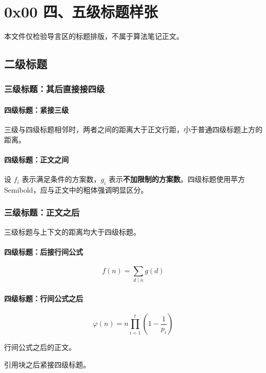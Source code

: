 \documentclass{article}
\begin{document}
\section{0x00 四、五级标题样张}
本文件仅检验导言区的标题排版，不属于算法笔记正文。

\subsection{二级标题}

\subsubsection{三级标题：其后直接接四级}

\paragraph{四级标题：紧接三级}

三级与四级标题相邻时，两者之间的距离大于正文行距，小于普通四级标题上方的距离。

\paragraph{四级标题：正文之间}

设 $f_i$ 表示满足条件的方案数，$g_i$ 表示\textbf{不加限制的方案数}。四级标题使用苹方
Semibold，应与正文中的粗体强调明显区分。

\subsubsection{三级标题：正文之后}

三级标题与上下文的距离均大于四级标题。

\paragraph{四级标题：后接行间公式}

\[
f(n) = \sum_{d \mid n} g(d)
\]

\paragraph{四级标题：行间公式之后}

\[
\varphi(n) = n \prod_{i = 1}^{t} \left( 1 - \frac{1}{p_i} \right)
\]

行间公式之后的正文。

\begin{quoteblock}
引用块之后紧接四级标题。
\end{quoteblock}
\end{document}
